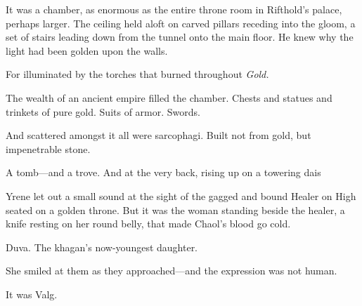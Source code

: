 It was a chamber, as enormous as the entire throne room in Rifthold's palace, perhaps larger. The ceiling held aloft on carved pillars receding into the gloom, a set of stairs leading down from the tunnel onto the main floor. He knew why the light had been golden upon the walls.

For illuminated by the torches that burned throughout 
\emph{Gold.}

The wealth of an ancient empire filled the chamber. Chests and statues and trinkets of pure gold. Suits of armor. Swords.

And scattered amongst it all were sarcophagi. Built not from gold, but impenetrable stone.

A tomb---and a trove. And at the very back, rising up on a towering dais


Yrene let out a small sound at the sight of the gagged and bound Healer on High seated on a golden throne. But it was the woman standing beside the healer, a knife resting on her round belly, that made Chaol's blood go cold.

Duva. The khagan's now-youngest daughter.

She smiled at them as they approached---and the expression was not human.

It was Valg.

